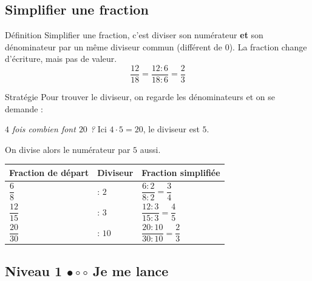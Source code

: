 \subsection{Simplifier une fraction}
 
\begin{regle}{Définition}
\textcolor{themeColor}{Simplifier} une fraction, c'est diviser son numérateur \textbf{et} son dénominateur par un même diviseur commun (différent de 0). La fraction change d'écriture, mais pas de valeur.
\[\dfrac{12}{18}=\dfrac{12 : 6}{18 : 6}=\dfrac{2}{3}\]
\end{regle}
 
\vspace{20pt}
\begin{astuce}{Stratégie}
Pour trouver le diviseur, on regarde les dénominateurs et on se demande :
 
\vspace{5pt}
{\centering\textit{\og $4$ fois combien font $20$ ?\fg{}} Ici $4 \cdot 5 = 20$, le diviseur est $5$.\par}
 
\vspace{5pt}
On divise alors le numérateur par $5$ aussi.
\end{astuce}
 
\vspace{20pt}
\def\arraystretch{3}
\begin{tabularx}{\linewidth}{|>{\centering\arraybackslash}X|>{\centering\arraybackslash}X|>{\centering\arraybackslash}X|}
\hline
\cellcolor{themeNO!30}\textbf{Fraction de départ} & \cellcolor{themeNO!30}\textbf{Diviseur} & \cellcolor{themeNO!30}\textbf{Fraction simplifiée} \\\hline
$\dfrac{6}{8}$ & $:\, 2$ & $\dfrac{6 : 2}{8 : 2}=\dfrac{3}{4}$ \\\hline
$\dfrac{12}{15}$ & $:\, 3$ & $\dfrac{12 : 3}{15 : 3}=\dfrac{4}{5}$ \\\hline
$\dfrac{20}{30}$ & $:\, 10$ & $\dfrac{20 : 10}{30 : 10}=\dfrac{2}{3}$ \\\hline
\end{tabularx}
\def\arraystretch{1}
 
 
\newpage
\subsection{Niveau 1 \quad $\bullet\circ\circ$ \quad Je me lance}
 
